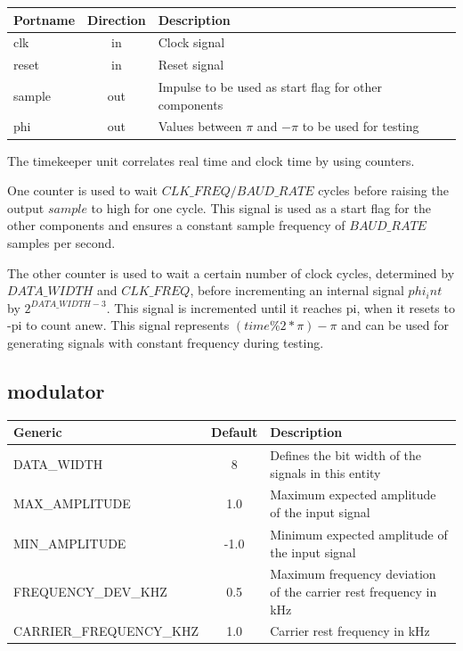 \begin{center}
	\begin{tabular}{ | l | c | l | }
		\hline
		\textbf{Portname} & \textbf{Direction} & \textbf{Description} \\
		\hline
		clk & in & Clock signal \\
		reset & in  & Reset signal \\
		sample & out  & Impulse to be used as start flag for other components \\
		phi & out  & Values between $\pi$ and $-\pi$ to be used for testing \\
		\hline
	\end{tabular} 
\end{center}

The timekeeper unit correlates real time and clock time by using counters.

One counter is used to wait $CLK\_FREQ/BAUD\_RATE$ cycles before raising the output $sample$ to high for one cycle. This signal is used as a start flag for the other components and ensures a constant sample frequency of $BAUD\_RATE$ samples per second.

The other counter is used to wait a certain number of clock cycles, determined by ${DATA\_WIDTH}$ and ${CLK\_FREQ}$, before incrementing an internal signal $phi_int$ by $2^{DATA\_WIDTH - 3}$. This signal is incremented until it reaches pi, when it resets to -pi to count anew. This signal represents $(time \% 2*\pi) - \pi$ and can be used for generating signals with constant frequency during testing.

\subsection{modulator}

\begin{adjustwidth}{-2.7cm}{}
	\begin{center}
		\begin{tabular}{ | l | c | l | }
			\hline
			\textbf{Generic} & \textbf{Default} & \textbf{Description} \\ \hline
			DATA\_WIDTH & 8 & Defines the bit width of the signals in this entity \\
			MAX\_AMPLITUDE & 1.0 & Maximum expected amplitude of the input signal \\
			MIN\_AMPLITUDE & -1.0 & Minimum expected amplitude of the input signal \\
			FREQUENCY\_DEV\_KHZ & 0.5 & Maximum frequency deviation of the carrier rest frequency in kHz \\
			CARRIER\_FREQUENCY\_KHZ & 1.0 & Carrier rest frequency in kHz \\
			\hline
		\end{tabular} 
	\end{center}
\end{adjustwidth}


